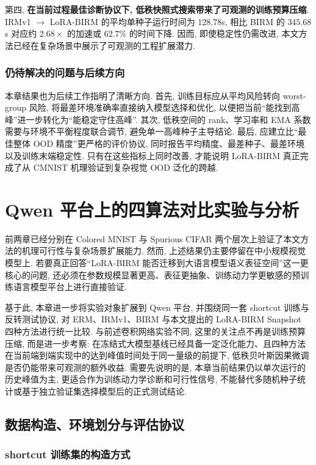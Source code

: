 \documentclass[a4paper,punct=banjiao,twoside]{ctexrep}
\theoremstyle{plain}
\theoremstyle{definition}
\theoremstyle{remark}
\begin{document}
第四, \textbf{在当前过程最佳诊断协议下, 低秩快照式搜索带来了可观测的训练预算压缩}. IRMv1 $\rightarrow$ LoRA-BIRM 的平均单种子运行时间为 $128.78$s, 相比 BIRM 的 $345.68$s 对应约 $2.68\times$ 的加速或 $62.7\%$ 的时间下降. 因而, 即使稳定性仍需改进, 本文方法已经在复杂场景中展示了可观测的工程扩展潜力.

\subsection{仍待解决的问题与后续方向}

本章结果也为后续工作指明了清晰方向. 首先, 训练目标应从平均风险转向 worst-group 风险, 将最差环境准确率直接纳入模型选择和优化, 以便把当前“能找到高峰”进一步转化为“能稳定守住高峰”. 其次, 低秩空间的 rank、学习率和 EMA 系数需要与环境不平衡程度联合调节, 避免单一高峰种子主导结论. 最后, 应建立比“最佳整体 OOD 精度”更严格的评价协议, 同时报告平均精度、最差种子、最差环境以及训练末端稳定性. 只有在这些指标上同时改善, 才能说明 LoRA-BIRM 真正完成了从 CMNIST 机理验证到复杂视觉 OOD 泛化的跨越.

\chapter{Qwen 平台上的四算法对比实验与分析}

前两章已经分别在 Colored MNIST 与 Spurious CIFAR 两个层次上验证了本文方法的机理可行性与复杂场景扩展能力. 然而, 上述结果仍主要停留在中小规模视觉模型上. 若要真正回答“LoRA-BIRM 能否迁移到大语言模型语义表征空间”这一更核心的问题, 还必须在参数规模显著更高、表征更抽象、训练动力学更敏感的预训练语言模型平台上进行直接验证.

基于此, 本章进一步将实验对象扩展到 Qwen 平台, 并围绕同一套 shortcut 训练与反转测试协议, 对 ERM、IRMv1、BIRM 与本文提出的 LoRA-BIRM Snapshot 四种方法进行统一比较. 与前述卷积网络实验不同, 这里的关注点不再是训练预算压缩, 而是进一步考察: 在冻结式大模型基线已经具备一定泛化能力、且四种方法在当前端到端实现中的达到峰值时间处于同一量级的前提下, 低秩贝叶斯因果微调是否仍能带来可观测的额外收益. 需要先说明的是, 本章当前结果仍以单次运行的历史峰值为主, 更适合作为训练动力学诊断和可行性信号, 不能替代多随机种子统计或基于独立验证集选择模型后的正式测试结论.

\section{数据构造、环境划分与评估协议}
\subsection{shortcut 训练集的构造方式}
\end{document}
